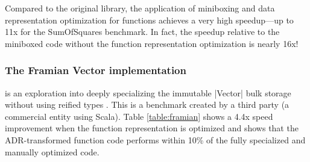 Compared to the original library, the application of miniboxing and
data representation optimization for functions achieves a very high
speedup---up to 11x for the SumOfSquares benchmark. In fact, the
speedup relative to the miniboxed code without the function
representation optimization is nearly 16x! 


\subsubsection{The Framian Vector implementation} is an exploration into deeply specializing the immutable |Vector| bulk storage without using reified types \cite{tixxit-respecialization15,tixxit-respecialization6}. This is a benchmark created by a third party (a commercial entity using Scala). Table \ref{table:framian} shows a 4.4x speed improvement when the function representation is optimized and shows that the ADR-transformed function code performs within 10\% of the fully specialized and manually optimized code. 

